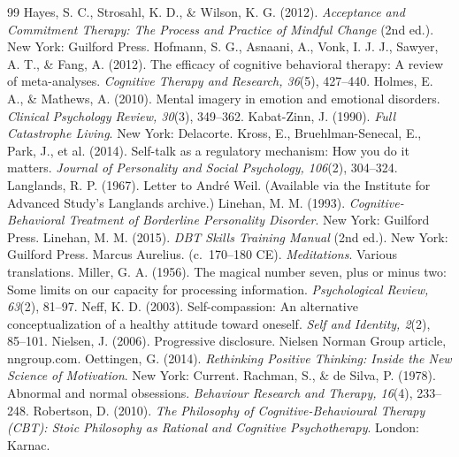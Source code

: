 \documentclass[11pt]{article}
\begin{document}
\begin{thebibliography}{99}
 Hayes, S. C., Strosahl, K. D., \& Wilson, K. G. (2012). \emph{Acceptance and Commitment Therapy: The Process and Practice of Mindful Change} (2nd ed.). New York: Guilford Press.
 Hofmann, S. G., Asnaani, A., Vonk, I. J. J., Sawyer, A. T., \& Fang, A. (2012). The efficacy of cognitive behavioral therapy: A review of meta-analyses. \emph{Cognitive Therapy and Research, 36}(5), 427--440.
 Holmes, E. A., \& Mathews, A. (2010). Mental imagery in emotion and emotional disorders. \emph{Clinical Psychology Review, 30}(3), 349--362.
 Kabat-Zinn, J. (1990). \emph{Full Catastrophe Living}. New York: Delacorte.
 Kross, E., Bruehlman-Senecal, E., Park, J., et al. (2014). Self-talk as a regulatory mechanism: How you do it matters. \emph{Journal of Personality and Social Psychology, 106}(2), 304--324.
 Langlands, R. P. (1967). Letter to Andr\'e Weil. (Available via the Institute for Advanced Study's Langlands archive.)
 Linehan, M. M. (1993). \emph{Cognitive-Behavioral Treatment of Borderline Personality Disorder}. New York: Guilford Press.
 Linehan, M. M. (2015). \emph{DBT Skills Training Manual} (2nd ed.). New York: Guilford Press.
 Marcus Aurelius. (c.~170--180 CE). \emph{Meditations}. Various translations.
 Miller, G. A. (1956). The magical number seven, plus or minus two: Some limits on our capacity for processing information. \emph{Psychological Review, 63}(2), 81--97.
 Neff, K. D. (2003). Self-compassion: An alternative conceptualization of a healthy attitude toward oneself. \emph{Self and Identity, 2}(2), 85--101.
 Nielsen, J. (2006). Progressive disclosure. Nielsen Norman Group article, nngroup.com.
 Oettingen, G. (2014). \emph{Rethinking Positive Thinking: Inside the New Science of Motivation}. New York: Current.
 Rachman, S., \& de Silva, P. (1978). Abnormal and normal obsessions. \emph{Behaviour Research and Therapy, 16}(4), 233--248.
 Robertson, D. (2010). \emph{The Philosophy of Cognitive-Behavioural Therapy (CBT): Stoic Philosophy as Rational and Cognitive Psychotherapy}. London: Karnac.

\end{thebibliography}
\end{document}
